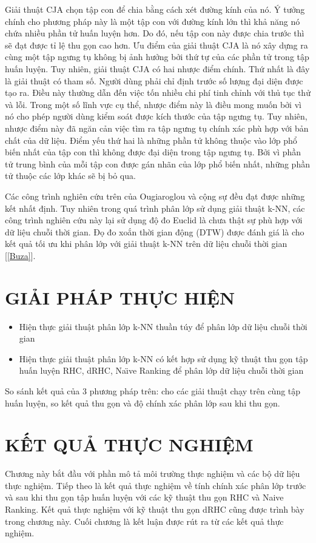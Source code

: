 \documentclass[13pt,oneside]{scrbook}
\begin{document}
Giải thuật CJA chọn tập con để chia bằng cách xét đường kính của nó.
Ý tưởng chính cho phương pháp này là một tập con với đường kính lớn thì khả năng nó chứa nhiều phần tử huấn luyện hơn.
Do đó, nếu tập con này được chia trước thì sẽ đạt được tỉ lệ thu gọn cao hơn.
Ưu điểm của giải thuật CJA là nó xây dựng ra cùng một tập ngưng tụ không bị ảnh hưởng bởi thứ tự của các phần tử trong tập huấn luyện.
Tuy nhiên, giải thuật CJA có hai nhược điểm chính.
Thứ nhất là đây là giải thuật có tham số.
Người dùng phải chỉ định trước số lượng đại diện được tạo ra.
Điều này thường dẫn đến việc tốn nhiều chi phí tinh chỉnh với thủ tục thử và lỗi.
Trong một số lĩnh vực cụ thể, nhược điểm này là điều mong muốn bởi vì nó cho phép người dùng kiểm soát được kích thước của tập ngưng tụ.
Tuy nhiên, nhược điểm này đã ngăn cản việc tìm ra tập ngưng tụ chính xác phù hợp với bản chất của dữ liệu.
Điểm yếu thứ hai là những phần tử không thuộc vào lớp phổ biến nhất của tập con thì không được đại diện trong tập ngưng tụ.
Bởi vì phần tử trung bình của mỗi tập con được gán nhãn của lớp phổ biến nhất, những phần tử thuộc các lớp khác sẽ bị bỏ qua.

Các công trình nghiên cứu trên của Ougiaroglou và cộng sự đều đạt được những kết nhất định.
Tuy nhiên trong quá trình phân lớp sử dụng giải thuật k-NN, các công trình nghiên cứu này lại sử dụng độ đo Euclid là chưa thật sự phù hợp với dữ liệu chuỗi thời gian.
Đọ đo xoắn thời gian động (DTW) được đánh giá là cho kết quả tối ưu khi phân lớp với giải thuật k-NN trên dữ liệu chuỗi thời gian [\ref{Buza}].
\newpage
\chapter{GIẢI PHÁP THỰC HIỆN}\label{Sec: Phan4}
\begin{itemize}
\item Hiện thực giải thuật phân lớp k-NN thuần túy để phân lớp dữ liệu chuỗi thời gian
\item Hiện thực giải thuật phân lớp k-NN có kết hợp sử dụng kỹ thuật thu gọn tập huấn luyện RHC, dRHC, Na{\"\i}ve Ranking để phân lớp dữ liệu chuỗi thời gian
\end{itemize}

So sánh kết quả của 3 phương pháp trên: cho các giải thuật chạy trên cùng tập huấn luyện, so kết quả thu gọn và độ chính xác phân lớp sau khi thu gọn.

\newpage
\chapter{KẾT QUẢ THỰC NGHIỆM}
Chương này bắt đầu với phần mô tả môi trường thực nghiệm và các bộ dữ liệu thực nghiệm. Tiếp theo là kết quả thực nghiệm về tính chính xác phân lớp trước và sau khi thu gọn tập huấn luyện với các kỹ thuật thu gọn RHC và Naive Ranking. Kết quả thực nghiệm với kỹ thuật thu gọn dRHC cũng được trình bày trong chương này. Cuối chương là kết luận được rút ra từ các kết quả thực nghiệm.
\end{document}
